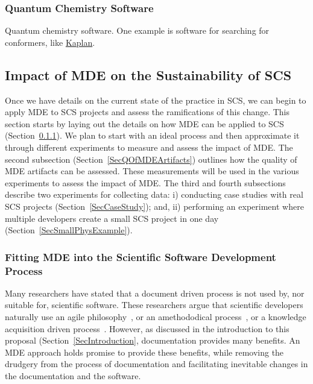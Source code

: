 \documentclass[12pt]{article}
\begin{document}
\subsubsection{Quantum Chemistry Software}

Quantum chemistry software.  One example is software for searching for
conformers, like
\href{https://github.com/PeaWagon/Kaplan}{Kaplan}.  %

\subsection{Impact of MDE on the Sustainability of SCS} \label{SecImpactMDE}

Once we have details on the current state of the practice in SCS, we can begin
to apply MDE to SCS projects and assess the ramifications of this change.  This
section starts by laying out the details on how MDE can be applied to SCS
(Section~\ref{SecMDEProcess}).  We plan to start with an ideal process and then
approximate it through different experiments to measure and assess the impact of
MDE.  The second subsection (Section~\ref{SecQOfMDEArtifacts}) outlines how the
quality of MDE artifacts can be assessed.  These measurements will be used in
the various experiments to assess the impact of MDE.  The third and fourth
subsections describe two experiments for collecting data: i) conducting case
studies with real SCS projects (Section~\ref{SecCaseStudy}); and, ii) performing
an experiment where multiple developers create a small SCS project in one day
(Section~\ref{SecSmallPhysExample}).

\subsubsection{Fitting MDE into the Scientific Software Development
  Process} \label{SecMDEProcess}

Many researchers have stated that a document driven process is not used by, nor
suitable for, scientific software.  These researchers argue that scientific
developers naturally use an agile philosophy~\cite{AckroydEtAl2008,
  CarverEtAl2007, EasterbrookAndJohns2009, Segal2005}, or an amethododical
process~\cite{Kelly2013}, or a knowledge acquisition driven
process~\cite{Kelly2015}.  However, as discussed in the introduction to this
proposal (Section~\ref{SecIntroduction}, documentation provides many benefits.
An MDE approach holds promise to provide these benefits, while removing the
drudgery from the process of documentation and facilitating inevitable changes
in the documentation and the software.
\end{document}

